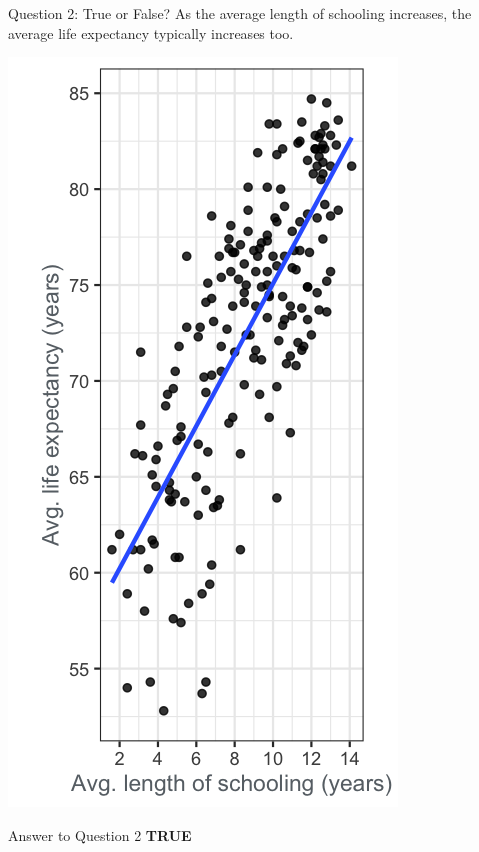 \documentclass[
  ignorenonframetext,
]{beamer}
\begin{document}
\begin{frame}{Question 2: True or False?}
\label{question-2-true-or-false}
As the average length of schooling increases, the average life
expectancy typically increases too.

\includegraphics{../images/im40.png}
\end{frame}

\begin{frame}{Answer to Question 2}
\label{answer-to-question-2}
\textbf{TRUE}
\end{frame}
\end{document}
